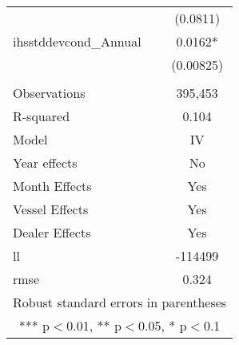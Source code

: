 \begin{tabular}{lc}
 & (0.0811) \\
ihsstddevcond\_Annual & 0.0162* \\
 & (0.00825) \\
 &  \\
Observations & 395,453 \\
R-squared & 0.104 \\
Model & IV \\
Year effects & No \\
Month Effects & Yes \\
Vessel Effects & Yes \\
Dealer Effects & Yes \\
ll & -114499 \\
 rmse & 0.324 \\ \hline
\multicolumn{2}{c}{ Robust standard errors in parentheses} \\
\multicolumn{2}{c}{ *** p$<$0.01, ** p$<$0.05, * p$<$0.1} \\
\end{tabular}
